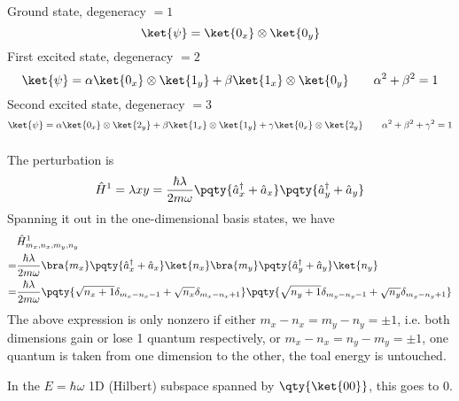 \documentclass[12pt]{article}
\begin{document}
        \subsubsection{} Ground state, degeneracy \( = 1\) \[
            \ket{\psi} = \ket{0_x}\otimes \ket{0_y} 
        \]
        First excited state, degeneracy \( = 2\)
        \[
            \ket{\psi} = \alpha\ket{0_x} \otimes \ket{1_y} + \beta\ket{1_x} \otimes \ket{0_y} \qquad \alpha^2 + \beta^2 = 1
        \]
        Second excited state, degeneracy \( = 3\) \[
            \ket{\psi} = \alpha\ket{0_x} \otimes \ket{2_y} + \beta\ket{1_x} \otimes \ket{1_y} + \gamma \ket{0_x}\otimes \ket{2_y}  \qquad \alpha^2 + \beta^2 + \gamma^2 = 1
        \]
        \subsubsection{} The perturbation is \[
            \hat{H}^1 =\lambda xy = \frac{\hbar\lambda }{2m\omega}\pqty{\hat{a}^\dagger_x + \hat{a}_x}\pqty{\hat{a}^\dagger_y + \hat{a}_y}
        \]
        Spanning it out in the one-dimensional basis states, we have \begin{align*}
            &\hat{H}^1_{m_x,n_x,m_y,n_y} \\
            =& \frac{\hbar\lambda}{2m\omega} \bra{m_x} \pqty{\hat{a}^\dagger_x + \hat{a}_x} \ket{n_x} \bra{m_y} \pqty{\hat{a}^\dagger_y + \hat{a}_y}\ket{n_y} \\
            =& \frac{\hbar\lambda}{2m\omega} \pqty{\sqrt{n_x + 1} \delta_{m_x - n_x - 1} + \sqrt{n_x} \delta_{m_x - n_x + 1}}\pqty{\sqrt{n_y + 1} \delta_{m_y - n_y - 1} + \sqrt{n_y} \delta_{m_y - n_y + 1}}
        \end{align*}
        The above expression is only nonzero if either \(m_x - n_x = m_y - n_y =\pm 1\), i.e. both dimensions gain or lose 1 quantum respectively, or \(m_x - n_x = n_y - m_y =\pm 1\), one quantum is taken from one dimension to the other, the toal energy is untouched.

        In the \(E = \hbar\omega\) 1D (Hilbert) subspace spanned by \(\qty{\ket{00}}\), this goes to \(0\).
        
\end{document}
